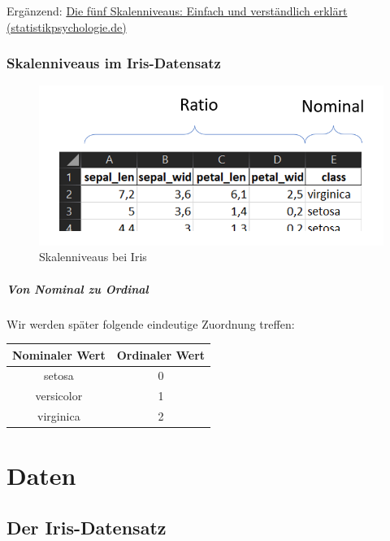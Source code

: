 \documentclass[
  oneside]{book}
\theoremstyle{definition}
\theoremstyle{definition}
\theoremstyle{definition}
\theoremstyle{definition}
\theoremstyle{remark}
\begin{document}
Ergänzend: \href{https://www.statistikpsychologie.de/skalenniveaus/}{Die fünf Skalenniveaus: Einfach und verständlich erklärt (statistikpsychologie.de)}

\hypertarget{skalenniveaus-im-iris-datensatz}{%
\subsection{Skalenniveaus im Iris-Datensatz}\label{skalenniveaus-im-iris-datensatz}}

\begin{figure}
\centering
\includegraphics{assets/daten.assets/image-20211209145313372.png}
\caption{Skalenniveaus bei Iris}
\end{figure}

\hypertarget{von-nominal-zu-ordinal}{%
\paragraph{Von Nominal zu Ordinal}\label{von-nominal-zu-ordinal}}

Wir werden später folgende eindeutige Zuordnung treffen:

\begin{longtable}[]{@{}cc@{}}
\toprule
Nominaler Wert & Ordinaler Wert \\
\midrule
\endhead
setosa & 0 \\
versicolor & 1 \\
virginica & 2 \\
\bottomrule
\end{longtable}

\hypertarget{daten-1}{%
\chapter{Daten}\label{daten-1}}

\hypertarget{der-iris-datensatz-1}{%
\section{Der Iris-Datensatz}\label{der-iris-datensatz-1}}
\end{document}
